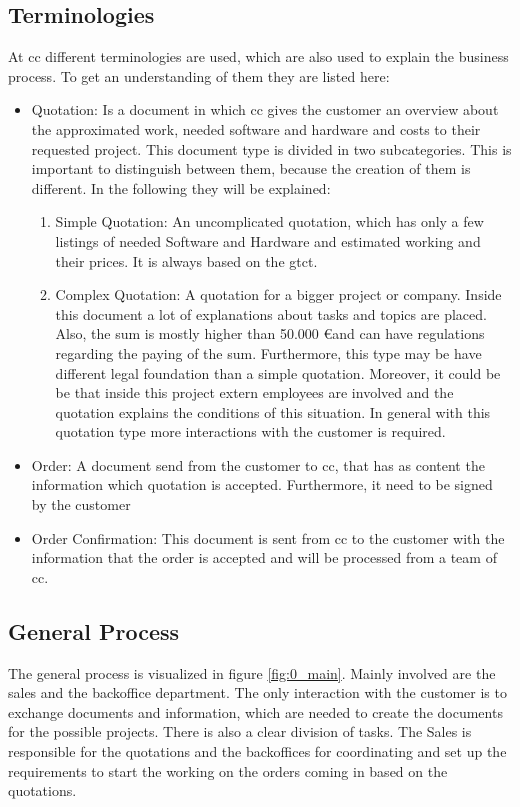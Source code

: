 \subsection*{Terminologies}
At \gls{cc} different terminologies are used, which are also used to explain the business process. To get an understanding of them they are listed here:
\begin{itemize}
	\item Quotation: \newline
	Is a document in which \gls{cc} gives the customer an overview about the approximated work, needed software and hardware and costs to their requested project. This document type is divided in two subcategories. This is important to distinguish between them, because the creation of them is different. In the following they will be explained:
	\begin{enumerate}
		\item Simple Quotation: \newline
		An uncomplicated quotation, which has only a few listings of needed Software and Hardware and estimated working and their prices. It is always based on the \gls{gtct}.
		\item Complex Quotation: \newline
		A quotation for a bigger project or company. Inside this document a lot of explanations about tasks and topics are placed. Also, the sum is mostly higher than 50.000 \euro and can have regulations regarding the paying of the sum. Furthermore, this type may be have different legal foundation than a simple quotation. Moreover, it could be be that inside this project extern employees are involved and the quotation explains the conditions of this situation. In general with this quotation type more interactions with the customer is required. 
	\end{enumerate}
	\item Order: \newline
	A document send from the customer to \gls{cc}, that has as content the information which quotation is accepted. Furthermore, it need to be signed by the customer
	\item Order Confirmation: \newline
	This document is sent from \gls{cc} to the customer with the information that the order is accepted and will be processed from a team of \gls{cc}.
\end{itemize}

\subsection*{General Process}
The general process is visualized in figure \ref{fig:0_main}. Mainly involved are the sales and the backoffice department. The only interaction with the customer is to exchange documents and information, which are needed to create the documents for the possible projects. There is also a clear division of tasks. The Sales is responsible for the quotations and the backoffices for coordinating and set up the requirements to start the working on the orders coming in based on the quotations.

